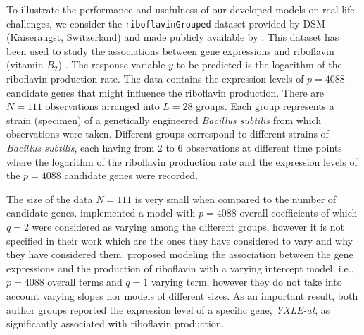 To illustrate the performance and usefulness of our developed models on real life challenges, we consider the \texttt{riboflavinGrouped} dataset provided by DSM (Kaiseraugst, Switzerland) and made publicly available by \cite{BuehlmannBio}. This dataset has been used to study the associations between gene expressions and riboflavin (vitamin $B_2$) \citep{BuehlmannBio, LinLina}. The response variable $y$ to be predicted is the logarithm of the riboflavin production rate. The data contains the expression levels of $p=4088$ candidate genes that might influence the riboflavin production. There are $N=111$ observations arranged into $L=28$ groups. Each group represents a strain (specimen) of a genetically engineered \textit{Bacillus subtilis} from which observations were taken. Different groups correspond to different strains of \textit{Bacillus subtilis}, each having from 2 to 6 observations at different time points where the logarithm of the riboflavin production rate and the expression levels of the $p=4088$ candidate genes were recorded.

The size of the data $N=111$ is very small when compared to the number of candidate genes. \cite{BuehlmannBio} implemented a model with $p=4088$ overall coefficients of which $q=2$ were considered as varying among the different groups, however it is not specified in their work which are the ones they have considered to vary and why they have considered them.  \cite{LinLina} proposed modeling the association between the gene expressions and the production of riboflavin with a varying intercept model, i.e., $p=4088$ overall terms and $q=1$ varying term, however they do not take into account varying slopes nor models of different sizes. As an important result, both author groups reported the expression level of a specific gene, \textit{YXLE-at}, as significantly associated with riboflavin production.

